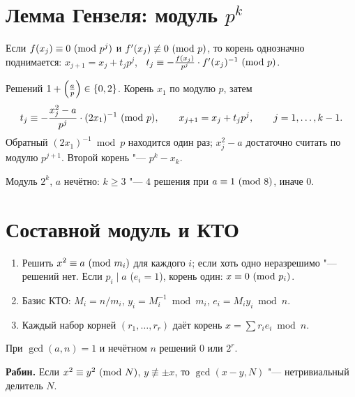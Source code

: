 \documentclass{ca-handout}
\begin{document}
\section{Лемма Гензеля: модуль $p^k$}
Если $f(x_j) \equiv 0 \ (\mathrm{mod}\ p^j)$ и $f'(x_j) \not\equiv 0 \ (\mathrm{mod}\ p)$, то корень однозначно
поднимается: $x_{j+1} = x_j + t_j p^j$, \ $t_j \equiv -\frac{f(x_j)}{p^j} \cdot f'(x_j)^{-1} \ (\mathrm{mod}\ p)$.
\begin{reminder}[title={$x^2 \equiv a \pmod{p^k}$, $p$ нечётно, $p \nmid a$}]
Решений $1 + \left(\frac{a}{p}\right) \in \{0, 2\}$. Корень $x_1$ по модулю $p$, затем
\[
  t_j \equiv -\frac{x_j^2 - a}{p^j} \cdot (2x_1)^{-1} \ (\mathrm{mod}\ p), \qquad x_{j+1} = x_j + t_j p^j,
  \qquad j = 1, \dots, k - 1.
\]
Обратный $(2x_1)^{-1} \bmod p$ находится один раз; $x_j^2 - a$ достаточно считать по модулю
$p^{j+1}$. Второй корень "--- $p^k - x_k$.
\end{reminder}
Модуль $2^k$, $a$ нечётно: $k \ge 3$ "--- $4$ решения при $a \equiv 1 \ (\mathrm{mod}\ 8)$, иначе $0$.

\section{Составной модуль и КТО}
\begin{reminder}[title={$x^2 \equiv a \pmod n$, $n = m_1 \cdots m_r$, $m_i = p_i^{e_i}$}]
\begin{enumerate}
  \item Решить $x^2 \equiv a \ (\mathrm{mod}\ m_i)$ для каждого $i$; если хоть одно неразрешимо "---
    решений нет. Если $p_i \mid a$ ($e_i = 1$), корень один: $x \equiv 0 \ (\mathrm{mod}\ p_i)$.
  \item Базис КТО: $M_i = n/m_i$, $y_i = M_i^{-1} \bmod m_i$, $e_i = M_i y_i \bmod n$.
  \item Каждый набор корней $(r_1, \dots, r_r)$ даёт корень $x = \sum r_i e_i \bmod n$.
\end{enumerate}
При $\gcd(a, n) = 1$ и нечётном $n$ решений $0$ или $2^r$.
\end{reminder}
\textbf{Рабин.} Если $x^2 \equiv y^2 \ (\mathrm{mod}\ N)$, $y \not\equiv \pm x$, то $\gcd(x - y, N)$ "---
нетривиальный делитель $N$.
\end{document}
